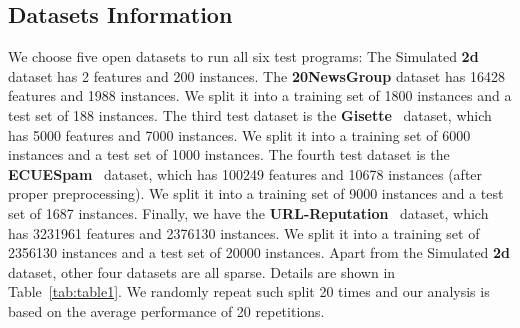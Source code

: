 \documentclass[10pt, conference, compsocconf]{IEEEtran}
\begin{document}
\subsection{Datasets Information}
We choose five open datasets to run all six test programs:	
The	Simulated \textbf{2d} dataset has 2 features and 200 instances.
The	\textbf{20NewsGroup} dataset has 16428 features and 1988 instances. We split it into a training set of 1800 instances and a test set of 188 instances.	
The	third test dataset is the \textbf{Gisette}~\cite{guyon2004result} dataset, which has 5000 features and 7000 instances. We split it into a training set of 6000 instances and a test set of 1000 instances.
The	fourth test dataset is the \textbf{ECUESpam}~\cite{DelanyKBS05} dataset, which has 100249 features and 10678 instances (after proper preprocessing). We split it into a training set of 9000 instances and a test set of 1687 instances.
Finally, we have the \textbf{URL-Reputation}~\cite{ma2009identifying} dataset, which has 3231961 features and 2376130 instances.
We split it into a training set of 2356130 instances and a test set of 20000 instances.
Apart from the Simulated \textbf{2d} dataset, other four datasets are all sparse. Details are shown in Table~\ref{tab:table1}.
We randomly repeat such split 20 times and our analysis is based on the average performance of 20 repetitions.
\end{document}
